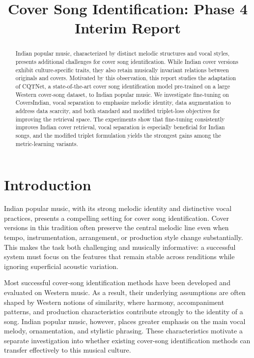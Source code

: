 \documentclass[conference]{IEEEtran}
\title{Cover Song Identification: Phase 4 Interim Report}
\author{
    \IEEEauthorblockN{Rojin Raju \\ Guided by: Dr. Joe Cheri Ross}
    \IEEEauthorblockA{\textit{National Institute of Technology, Calicut}}
}
\begin{document}
\maketitle

\begin{abstract}
Indian popular music, characterized by distinct melodic structures and vocal styles, presents additional challenges for cover song identification. While Indian cover versions exhibit culture-specific traits, they also retain musically invariant relations between originals and covers. Motivated by this observation, this report studies the adaptation of CQTNet, a state-of-the-art cover song identification model pre-trained on a large Western cover-song dataset, to Indian popular music. We investigate fine-tuning on CoversIndian, vocal separation to emphasize melodic identity, data augmentation to address data scarcity, and both standard and modified triplet-loss objectives for improving the retrieval space. The experiments show that fine-tuning consistently improves Indian cover retrieval, vocal separation is especially beneficial for Indian songs, and the modified triplet formulation yields the strongest gains among the metric-learning variants.
\end{abstract}


\section{Introduction}
Indian popular music, with its strong melodic identity and distinctive vocal practices, presents a compelling setting for cover song identification. Cover versions in this tradition often preserve the central melodic line even when tempo, instrumentation, arrangement, or production style change substantially. This makes the task both challenging and musically informative: a successful system must focus on the features that remain stable across renditions while ignoring superficial acoustic variation.

Most successful cover-song identification methods have been developed and evaluated on Western music. As a result, their underlying assumptions are often shaped by Western notions of similarity, where harmony, accompaniment patterns, and production characteristics contribute strongly to the identity of a song. Indian popular music, however, places greater emphasis on the main vocal melody, ornamentation, and stylistic phrasing. These characteristics motivate a separate investigation into whether existing cover-song identification methods can transfer effectively to this musical culture.
\end{document}
